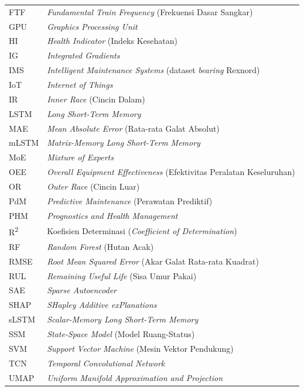 \begin{singlespace}
\begin{longtable}{@{}p{2.6cm}p{\dimexpr\textwidth-2.6cm-2\tabcolsep\relax}@{}}
FTF         & \emph{Fundamental Train Frequency} (Frekuensi Dasar Sangkar) \\
GPU         & \emph{Graphics Processing Unit} \\
HI          & \emph{Health Indicator} (Indeks Kesehatan) \\
IG          & \emph{Integrated Gradients} \\
IMS         & \emph{Intelligent Maintenance Systems} (dataset \emph{bearing} Rexnord) \\
IoT         & \emph{Internet of Things} \\
IR          & \emph{Inner Race} (Cincin Dalam) \\
LSTM        & \emph{Long Short-Term Memory} \\
MAE         & \emph{Mean Absolute Error} (Rata-rata Galat Absolut) \\
mLSTM       & \emph{Matrix-Memory Long Short-Term Memory} \\
MoE         & \emph{Mixture of Experts} \\
OEE         & \emph{Overall Equipment Effectiveness} (Efektivitas Peralatan Keseluruhan) \\
OR          & \emph{Outer Race} (Cincin Luar) \\
PdM         & \emph{Predictive Maintenance} (Perawatan Prediktif) \\
PHM         & \emph{Prognostics and Health Management} \\
R\textsuperscript{2} & Koefisien Determinasi (\emph{Coefficient of Determination}) \\
RF          & \emph{Random Forest} (Hutan Acak) \\
RMSE        & \emph{Root Mean Squared Error} (Akar Galat Rata-rata Kuadrat) \\
RUL         & \emph{Remaining Useful Life} (Sisa Umur Pakai) \\
SAE         & \emph{Sparse Autoencoder} \\
SHAP        & \emph{SHapley Additive exPlanations} \\
sLSTM       & \emph{Scalar-Memory Long Short-Term Memory} \\
SSM         & \emph{State-Space Model} (Model Ruang-Status) \\
SVM         & \emph{Support Vector Machine} (Mesin Vektor Pendukung) \\
TCN         & \emph{Temporal Convolutional Network} \\
UMAP        & \emph{Uniform Manifold Approximation and Projection} \\

\end{longtable}
\end{singlespace}
